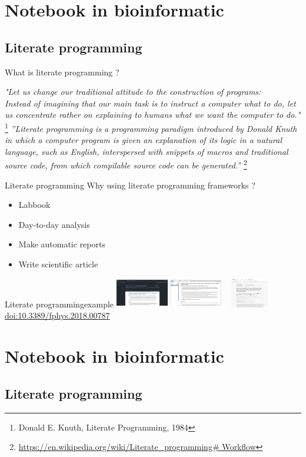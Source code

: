 \section{Notebook in bioinformatic}
\subsection*{Literate programming}

\begin{frame}
What is literate programming ?

\emph{
"Let us change our traditional attitude to the construction of programs: \\
Instead of imagining that our main task is to instruct a computer what to do, let us concentrate rather on explaining to humans what we want the computer to do."}
\footnote{Donald E. Knuth, Literate Programming, 1984} 
\newline
\emph{
”Literate programming is a programming paradigm introduced by Donald Knuth in
which a computer program is given an explanation of its logic in a natural language,
such as English, interspersed with snippets of macros and traditional source code,
from which compilable source code can be generated.”}
\footnote{\url{https://en.wikipedia.org/wiki/Literate_programming\# Workﬂow}}
\end{frame}

\begin{frame}{Literate programming}
Why using literate programming frameworks ?
\begin{itemize}
	\item Labbook
	\item Day-to-day analysis
	\item Make automatic reports
	\item Write scientific article
\end{itemize}
\end{frame}

\begin{frame}{Literate programming}{example}
\includegraphics[width=2.3cm,height=1.3cm]{images/colomoto_github.png}
\includegraphics[width=2.3cm,height=1.3cm]{images/colomoto_jupyter.png}
\includegraphics[width=2.3cm,height=1.3cm]{images/colomoto_paper.png}
\href{https://www.frontiersin.org/articles/10.3389/fphys.2018.00787/full}{doi:10.3389/fphys.2018.00787}
\end{frame}

\section{Notebook in bioinformatic}
\subsection*{Literate programming}